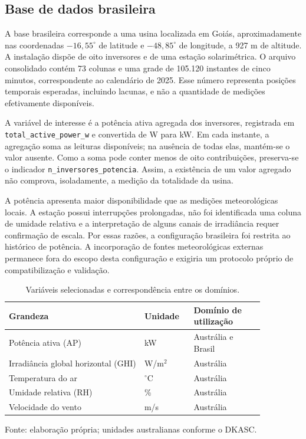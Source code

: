 \subsection{Base de dados brasileira}
\label{subsec:base_brasileira}

A base brasileira corresponde a uma usina localizada em Goiás, aproximadamente nas coordenadas $-16{,}55^\circ$ de latitude e $-48{,}85^\circ$ de longitude, a 927 m de altitude. A instalação dispõe de oito inversores e de uma estação solarimétrica. O arquivo consolidado contém 73 colunas e uma grade de 105.120 instantes de cinco minutos, correspondente ao calendário de 2025. Esse número representa posições temporais esperadas, incluindo lacunas, e não a quantidade de medições efetivamente disponíveis.

A variável de interesse é a potência ativa agregada dos inversores, registrada em \texttt{total\_active\_power\_w} e convertida de W para kW. Em cada instante, a agregação soma as leituras disponíveis; na ausência de todas elas, mantém-se o valor ausente. Como a soma pode conter menos de oito contribuições, preserva-se o indicador \texttt{n\_inversores\_potencia}. Assim, a existência de um valor agregado não comprova, isoladamente, a medição da totalidade da usina.

A potência apresenta maior disponibilidade que as medições meteorológicas locais. A estação possui interrupções prolongadas, não foi identificada uma coluna de umidade relativa e a interpretação de alguns canais de irradiância requer confirmação de escala. Por essas razões, a configuração brasileira foi restrita ao histórico de potência. A incorporação de fontes meteorológicas externas permanece fora do escopo desta configuração e exigiria um protocolo próprio de compatibilização e validação.

\begin{table}[htbp]
\centering
\caption{Variáveis selecionadas e correspondência entre os domínios.}
\label{tab:variaveis_modelagem}
\small
\begin{tabular}{p{0.46\linewidth}p{0.16\linewidth}p{0.24\linewidth}}
\hline
Grandeza & Unidade & Domínio de utilização \\
\hline
Potência ativa (AP) & kW & Austrália e Brasil \\
Irradiância global horizontal (GHI) & W/m$^2$ & Austrália \\
Temperatura do ar & $^\circ$C & Austrália \\
Umidade relativa (RH) & \% & Austrália \\
Velocidade do vento & m/s & Austrália \\
\hline
\end{tabular}
\par\smallskip
{\footnotesize Fonte: elaboração própria; unidades australianas conforme o DKASC.}
\end{table}

